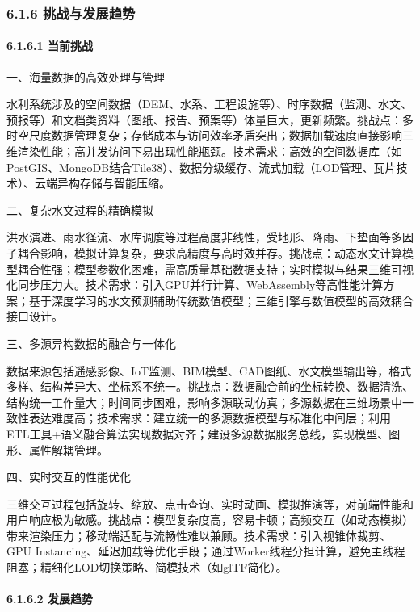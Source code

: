 \subsubsection{6.1.6 挑战与发展趋势}\label{ux6311ux6218ux4e0eux53d1ux5c55ux8d8bux52bf}

\paragraph{6.1.6.1 当前挑战}\label{ux5f53ux524dux6311ux6218}

一、海量数据的高效处理与管理

水利系统涉及的空间数据（DEM、水系、工程设施等）、时序数据（监测、水文、预报等）和文档类资料（图纸、报告、预案等）体量巨大，更新频繁。挑战点：多时空尺度数据管理复杂；存储成本与访问效率矛盾突出；数据加载速度直接影响三维渲染性能；高并发访问下易出现性能瓶颈。技术需求：高效的空间数据库（如PostGIS、MongoDB结合Tile38）、数据分级缓存、流式加载（LOD管理、瓦片技术）、云端异构存储与智能压缩。

二、复杂水文过程的精确模拟

洪水演进、雨水径流、水库调度等过程高度非线性，受地形、降雨、下垫面等多因子耦合影响，模拟计算复杂，要求高精度与高时效并存。挑战点：动态水文计算模型耦合性强；模型参数化困难，需高质量基础数据支持；实时模拟与结果三维可视化同步压力大。技术需求：引入GPU并行计算、WebAssembly等高性能计算方案；基于深度学习的水文预测辅助传统数值模型；三维引擎与数值模型的高效耦合接口设计。

三、多源异构数据的融合与一体化

数据来源包括遥感影像、IoT监测、BIM模型、CAD图纸、水文模型输出等，格式多样、结构差异大、坐标系不统一。挑战点：数据融合前的坐标转换、数据清洗、结构统一工作量大；时间同步困难，影响多源联动仿真；多源数据在三维场景中一致性表达难度高；技术需求：建立统一的多源数据模型与标准化中间层；利用ETL工具+语义融合算法实现数据对齐；建设多源数据服务总线，实现模型、图形、属性解耦管理。

四、实时交互的性能优化

三维交互过程包括旋转、缩放、点击查询、实时动画、模拟推演等，对前端性能和用户响应极为敏感。挑战点：模型复杂度高，容易卡顿；高频交互（如动态模拟）带来渲染压力；移动端适配与流畅性难以兼顾。技术需求：引入视锥体裁剪、GPU Instancing、延迟加载等优化手段；通过Worker线程分担计算，避免主线程阻塞；精细化LOD切换策略、简模技术（如glTF简化）。

\paragraph{6.1.6.2 发展趋势}\label{ux53d1ux5c55ux8d8bux52bf-1}

